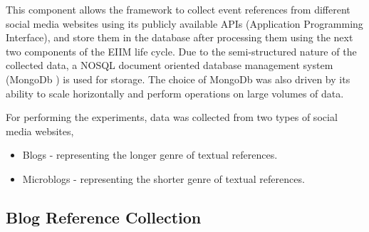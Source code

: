 This component allows the framework to collect event references from different social media websites using its publicly available APIs (Application Programming Interface), and store them in the database after processing them using the next two components of the EIIM life cycle. Due to the semi-structured nature of the collected data, a NOSQL document oriented database management system (MongoDb ) is used for storage. The choice of MongoDb was also driven by its ability to scale horizontally and perform operations on large volumes of data.

For performing the experiments, data was collected from two types of social media websites, 
\begin{itemize}
\item Blogs - representing the longer genre of textual references.
\item Microblogs - representing the shorter genre of textual references.
\end{itemize}


\subsection{Blog Reference Collection}

